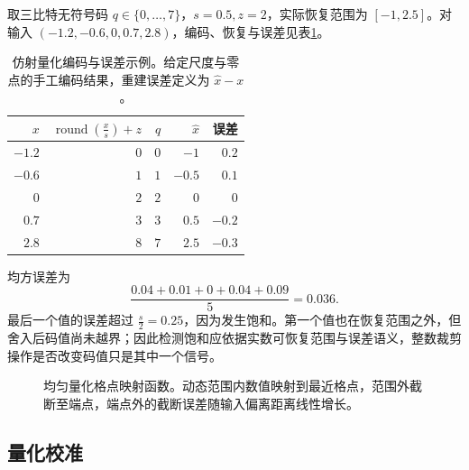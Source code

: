 \documentclass[../textbook.tex]{subfiles}
\begin{document}
\begin{example}


取三比特无符号码 $q\in\{0,\ldots,7\}$，$s=0.5,z=2$，实际恢复范围为 $[-1,2.5]$。对输入 $(-1.2,-0.6,0,0.7,2.8)$，编码、恢复与误差见表\ref{tab:model-optimization-affine-example}。
\begin{table}[htbp]
\centering
\caption[仿射量化编码与误差示例]{仿射量化编码与误差示例。给定尺度与零点的手工编码结果，重建误差定义为 $\widehat x-x$。}\label{tab:model-optimization-affine-example}
\begin{tabular}{rrrrr}
\toprule
$x$ & $\operatorname{round}(\frac{x}{s})+z$ & $q$ & $\widehat x$ & 误差\\
\midrule
$-1.2$ & $0$ & $0$ & $-1$ & $0.2$\\
$-0.6$ & $1$ & $1$ & $-0.5$ & $0.1$\\
$0$ & $2$ & $2$ & $0$ & $0$\\
$0.7$ & $3$ & $3$ & $0.5$ & $-0.2$\\
$2.8$ & $8$ & $7$ & $2.5$ & $-0.3$\\
\bottomrule
\end{tabular}
\end{table}
均方误差为
\[
 \frac{0.04+0.01+0+0.04+0.09}{5}=0.036.
\]
最后一个值的误差超过 $\frac{s}{2}=0.25$，因为发生饱和。第一个值也在恢复范围之外，但舍入后码值尚未越界；因此检测饱和应依据实数可恢复范围与误差语义，整数裁剪操作是否改变码值只是其中一个信号。

\begin{figure}[htbp]
\centering
{}
\caption[均匀量化格点映射函数]{均匀量化格点映射函数。动态范围内数值映射到最近格点，范围外截断至端点，端点外的截断误差随输入偏离距离线性增长。}\label{fig:opt-grid}
\end{figure}
\end{example}

\subsection{量化校准}
\end{document}
